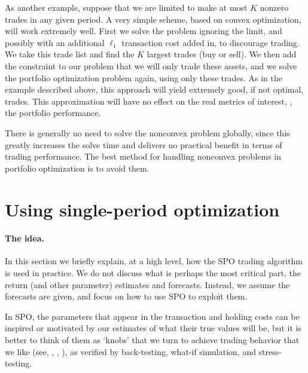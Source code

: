\documentclass[openany]{article}  %
\begin{document}
As another example, suppose that we are limited to make at most $K$ nonzero trades
in any given period.
A very simple scheme, based on convex optimization,  will work extremely well.
First we solve the problem ignoring the limit, and possibly with an additional
$\ell_1$ transaction cost added in, to discourage trading.  We take this trade list
and find the $K$ largest trades (buy or sell).  We then add the constraint to
our problem that we will only trade these assets, and we solve the
portfolio optimization problem again, using only these trades.
As in the example described above, this approach will yield extremely good, if not
optimal, trades.  This approximation will have no effect on the
real metrics of interest, \ie, the portfolio performance.

There is generally no need to solve the nonconvex problem
globally, since this greatly increases the solve time and delivers no
practical benefit in terms of trading performance.
The best method for handling nonconvex problems in portfolio optimization
is to avoid them.

\section{Using single-period optimization}
\label{subsec:using-spo}

\paragraph{The idea.}
In this section we briefly explain, at a high level, how the SPO trading
algorithm is used in practice.
We do not discuss what is perhaps the most critical part,
the return (and other parameter) estimates and forecasts.
Instead, we assume the forecasts are given, and focus on how to use SPO to
exploit them.

In SPO, the parameters that appear in the
transaction and holding costs can be
inspired or motivated by our estimates of what their true values will be,
but it is better to think of them as `knobs' that we turn to
achieve trading behavior that we like
(see, \eg, \cite[chapter 8]{cornuejols2006optimization},
\cite{jagannathan2003risk,demiguel2009generalized,li2015sparse}),
as verified by back-testing, what-if simulation, and stress-testing.
\end{document}

